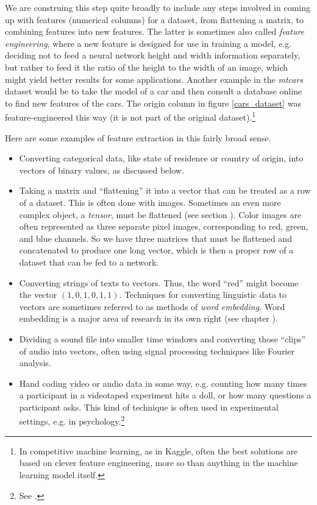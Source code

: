 We are construing this step quite broadly to include any steps involved in coming up with features (numerical columns) for a dataset, from flattening a matrix, to combining features into new features. The latter is sometimes also called \emph{feature engineering}, where a new feature is designed for use in training a model, e.g. deciding not to feed a neural network height and width information separately, but rather to feed it the ratio of the height to the width of an image, which might yield better results for some applications. Another example in the \emph{mtcars} dataset would be to take the model of a car and then consult a database online to find new features of the cars. The origin column in figure \ref{cars_dataset} was feature-engineered this way (it is not part of the original dataset).\footnote{In competitive machine learning, as in Kaggle, often the best solutions are based on clever feature engineering, more so than anything in the machine learning model itself.}

Here are some examples of feature extraction in this fairly broad sense. 
\begin{itemize}
\item Converting categorical data, like state of residence or country of origin, into vectors of binary values, as discussed below.
\item Taking a matrix and ``flattening'' it into a vector that can be treated as a row of a dataset. This is often done with images. Sometimes an even more complex object, a \emph{tensor}, must be flattened (see section ). Color images are often represented as three separate pixel  images, corresponding to red, green, and blue channels. So we have three matrices that must be flattened and concatenated to produce one long vector, which is then a proper row of a dataset that can be fed to a network.
\item Converting strings of texts to vectors. Thus, the word ``red'' might become the vector $(1,0,1,0,1,1)$. Techniques for converting linguistic data to vectors are sometimes referred to as methods of \emph{word embedding}. Word embedding is a major area of research in its own right (see chapter ).
\item Dividing a sound file into smaller time windows and converting those ``clips'' of audio into vectors, often using signal processing techniques like Fourier analysis.
\item Hand coding video or audio data in some way, e.g. counting how many times a participant in a videotaped experiment hits a doll, or how many questions a participant asks. This kind of technique is often used in experimental settings, e.g. in psychology.\footnote{See .}
\end{itemize}

